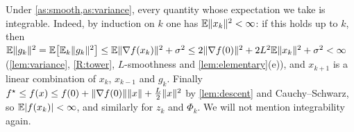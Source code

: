 \begin{remark}\label{rem:integrability}
Under \cref{as:smooth,as:variance}, every quantity whose expectation we take is integrable.
Indeed, by induction on $k$ one has $\mathbb{E}\lVert x_k\rVert^2<\infty$: if this holds up to $k$,
then $\mathbb{E}\lVert g_k\rVert^2=\mathbb{E}\bigl[\mathbb{E}_k\lVert g_k\rVert^2\bigr]\le\mathbb{E}\lVert \nabla f(x_k)\rVert^2+\sigma^2
\le2\lVert \nabla f(0)\rVert^2+2L^2\mathbb{E}\lVert x_k\rVert^2+\sigma^2<\infty$ (\cref{lem:variance},
\ref{R:tower}, $L$-smoothness and \cref{lem:elementary}(e)), and $x_{k+1}$ is a linear
combination of $x_k$, $x_{k-1}$ and $g_k$. Finally
$f^\star\le f(x)\le f(0)+\lVert \nabla f(0)\rVert\lVert x\rVert+\frac L2\lVert x\rVert^2$ by \cref{lem:descent}
and Cauchy--Schwarz, so $\mathbb{E}|f(x_k)|<\infty$, and similarly for $z_k$ and $\Phi_k$. We
will not mention integrability again.
\end{remark}
